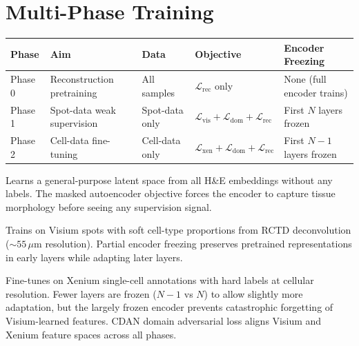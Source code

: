 \documentclass[11pt]{article}
\newcommand{\loss}{\mathcal{L}}
\begin{document}
\section*{Multi-Phase Training}

\begin{table}[h]
\centering
\begin{tabular}{@{}lllll@{}}
\toprule
\textbf{Phase}  & \textbf{Aim} & \textbf{Data} & \textbf{Objective} & \textbf{Encoder Freezing} \\
\midrule
Phase 0 & Reconstruction pretraining & All samples    & $\loss_{\text{rec}}$ only             & None (full encoder trains) \\
Phase 1 & Spot-data weak supervision & Spot-data only    & $\loss_{\text{vis}} + \loss_{\text{dom}} + \loss_{\text{rec}}$ & First $N$ layers frozen \\
Phase 2 & Cell-data fine-tuning & Cell-data only    & $\loss_{\text{xen}} + \loss_{\text{dom}} + \loss_{\text{rec}}$ & First $N{-}1$ layers frozen \\
\bottomrule
\end{tabular}
\end{table}

\begin{description}[style=unboxed, leftmargin=0pt]
\item[Phase 0 --- Reconstruction pretraining.]
Learns a general-purpose latent space from all H\&E embeddings without any labels. The masked autoencoder objective forces the encoder to capture tissue morphology before seeing any supervision signal.

\item[Phase 1 --- Visium weak supervision.]
Trains on Visium spots with soft cell-type proportions from RCTD deconvolution (${\sim}55\,\mu$m resolution). Partial encoder freezing preserves pretrained representations in early layers while adapting later layers.

\item[Phase 2 --- Xenium fine-tuning.]
Fine-tunes on Xenium single-cell annotations with hard labels at cellular resolution. Fewer layers are frozen ($N{-}1$ vs $N$) to allow slightly more adaptation, but the largely frozen encoder prevents catastrophic forgetting of Visium-learned features. CDAN domain adversarial loss aligns Visium and Xenium feature spaces across all phases.
\end{description}
\end{document}

